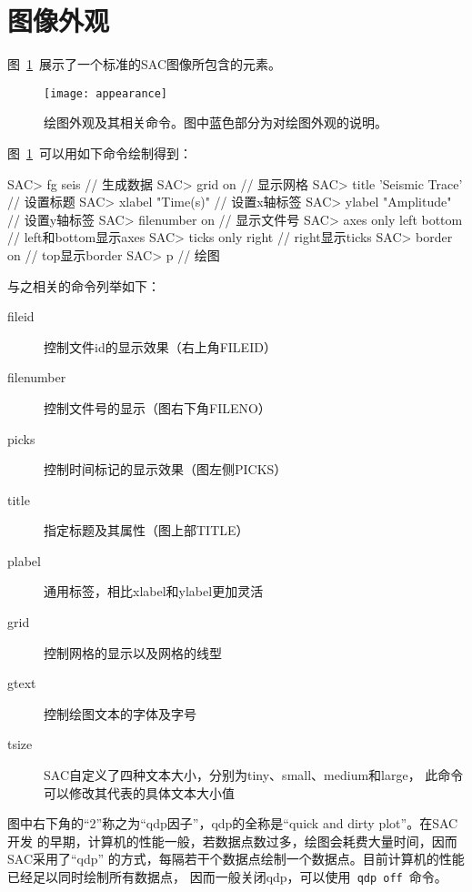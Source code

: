 \section{图像外观}
\label{sec:plot-appearance}

图~\ref{fig:plot-appearance}~展示了一个标准的SAC图像所包含的元素。

\begin{figure}[H]
\centering
\texttt{[image: appearance]}
\caption[绘图外观相关命令]{绘图外观及其相关命令。图中蓝色部分为对绘图外观的说明。}
\label{fig:plot-appearance}
\end{figure}

图~\ref{fig:plot-appearance}~可以用如下命令绘制得到：
\begin{SACCode}
SAC> fg seis                // 生成数据
SAC> grid on                // 显示网格                                          
SAC> title 'Seismic Trace'  // 设置标题                                          
SAC> xlabel "Time(s)"       // 设置x轴标签                                          
SAC> ylabel "Amplitude"     // 设置y轴标签                                       
SAC> filenumber on          // 显示文件号                                       
SAC> axes only left bottom  // left和bottom显示axes
SAC> ticks only right       // right显示ticks    
SAC> border on              // top显示border                                     
SAC> p                      // 绘图
\end{SACCode}

与之相关的命令列举如下：
\begin{description}
\item [fileid] 控制文件id的显示效果（右上角FILEID）
\item [filenumber] 控制文件号的显示（图右下角FILENO）
\item [picks] 控制时间标记的显示效果（图左侧PICKS）
\item [title] 指定标题及其属性（图上部TITLE）
\item [plabel] 通用标签，相比xlabel和ylabel更加灵活
\item [grid] 控制网格的显示以及网格的线型
\item [gtext] 控制绘图文本的字体及字号
\item [tsize] SAC自定义了四种文本大小，分别为tiny、small、medium和large，
    此命令可以修改其代表的具体文本大小值
\end{description}

图中右下角的``2''称之为``qdp因子''，qdp的全称是``quick and dirty plot''。在SAC开发
的早期，计算机的性能一般，若数据点数过多，绘图会耗费大量时间，因而SAC采用了``qdp''
的方式，每隔若干个数据点绘制一个数据点。目前计算机的性能已经足以同时绘制所有数据点，
因而一般关闭qdp，可以使用~\lstinline{qdp off}~命令。

